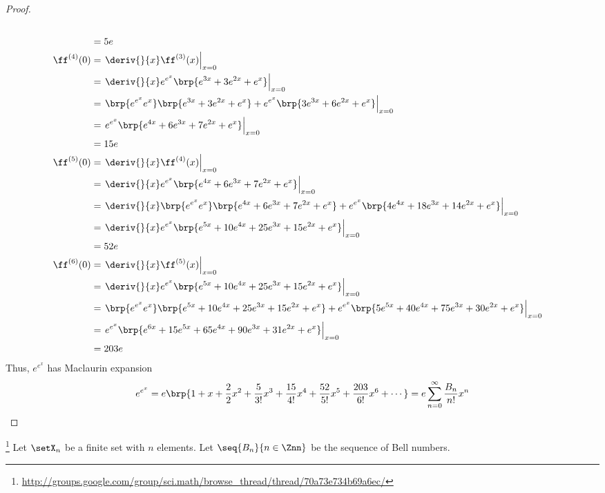 {\begin{proof}
\begin{align*}
  \\&= 5e
  \\
  \ff^{(4)}(0)
    &= \left.\deriv{}{x}\ff^{(3)}(x)\right|_{x=0}
  \\&= \left. \deriv{}{x} e^{e^x} \brp{e^{3x} + 3e^{2x} + e^x}  \right|_{x=0}
  \\&= \left. \brp{e^{e^x}e^x} \brp{e^{3x} + 3e^{2x} + e^x} + e^{e^x}\brp{3e^{3x} + 6e^{2x} + e^x}  \right|_{x=0}
  \\&= \left. e^{e^x} \brp{e^{4x} + 6e^{3x} + 7e^{2x} + e^{x}}   \right|_{x=0}
  \\&= 15e
  \\
  \ff^{(5)}(0)
    &= \left.\deriv{}{x}\ff^{(4)}(x)\right|_{x=0}
  \\&= \left. \deriv{}{x} e^{e^x} \brp{e^{4x} + 6e^{3x} + 7e^{2x} + e^{x}}   \right|_{x=0}
  \\&= \left. \deriv{}{x} \brp{e^{e^x}e^x} \brp{e^{4x} + 6e^{3x} + 7e^{2x} + e^{x}} + e^{e^x} \brp{4e^{4x} + 18e^{3x} + 14e^{2x} + e^{x}}   \right|_{x=0}
  \\&= \left. \deriv{}{x} e^{e^x} \brp{e^{5x} + 10e^{4x} + 25e^{3x} + 15e^{2x} + e^{x}}   \right|_{x=0}
  \\&= 52e
  \\
  \ff^{(6)}(0)
    &= \left.\deriv{}{x}\ff^{(5)}(x)\right|_{x=0}
  \\&= \left. \deriv{}{x} e^{e^x} \brp{e^{5x} + 10e^{4x} + 25e^{3x} + 15e^{2x} + e^{x}}   \right|_{x=0}
  \\&= \left. \brp{e^{e^x}e^x} \brp{e^{5x} + 10e^{4x} + 25e^{3x} + 15e^{2x} + e^{x}} + e^{e^x} \brp{5e^{5x} + 40e^{4x} + 75e^{3x} + 30e^{2x} + e^{x}}   \right|_{x=0}
  \\&= \left. e^{e^x} \brp{e^{6x} + 15e^{5x} + 65e^{4x} + 90e^{3x} + 31e^{2x} + e^{x}}   \right|_{x=0}
  \\&= 203e
\end{align*}
Thus, $e^{e^x}$ has Maclaurin expansion
  \[ e^{e^x} = e\brp{1 + x + \frac{2}{2}x^2 + \frac{5}{3!}x^3 + \frac{15}{4!}x^4 + \frac{52}{5!}x^5 + \frac{203}{6!}x^6 + \cdots}
             = e \sum_{n=0}^\infty \frac{B_n}{n!} x^n \]
\end{proof}

\begin{theorem}
\footnote{
  \url{http://groups.google.com/group/sci.math/browse_thread/thread/70a73e734b69a6ec/}
  }
\label{thm:num_P}
Let $\setX_n$ be a finite set with $n$ elements.
Let $\seq{B_n}{n\in\Znn}$ be the sequence of Bell numbers.
\end{theorem}


}
